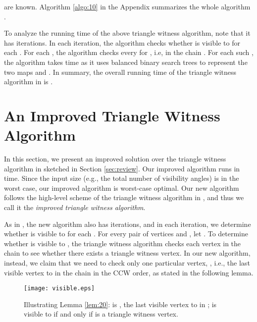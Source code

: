 \documentclass[11pt]{article}
\def\sectionspace{\vspace*{0in}}
\begin{document}
are known. Algorithm \ref{algo:10} in the Appendix summarizes the whole 
algorithm \cite{ref:DisserRe10}.

To analyze the running time of the above triangle witness algorithm,
note that it has  iterations. In each iteration, the
algorithm checks whether  is visible to  for
each . For each , the algorithm checks every 
for , i.e, in the chain . 
For each such , the algorithm takes  time as it 
uses balanced binary search trees to represent the two maps  and . 
In summary, the overall running time of the triangle witness algorithm in
\cite{ref:DisserRe10} is . 

\sectionspace
\section{An Improved Triangle Witness Algorithm}
\label{sec:improve}

In this section, we present an improved solution over the triangle
witness algorithm in \cite{ref:DisserRe10} 
sketched in Section \ref{sec:review}. Our improved
algorithm runs in  time. Since the input size (e.g., the total
number of visibility angles) is  in the worst case, our improved
algorithm is worst-case optimal. Our new algorithm follows the high-level 
scheme of the triangle witness algorithm in \cite{ref:DisserRe10}, and thus
we call it the {\em improved triangle witness algorithm}. 

As in \cite{ref:DisserRe10}, the new algorithm also has 
iterations, and in each iteration, we determine 
whether  is visible to  for each .
For every pair of vertices  and , let . To
determine whether 
is visible to , the triangle witness algorithm \cite{ref:DisserRe10}
checks each vertex  in the chain  to 
see whether there exists a triangle witness vertex. 
In our new algorithm, instead, we claim that we 
need to check only one particular vertex, , i.e., the
last visible vertex to  in the chain  in the
CCW order, as stated in the following lemma. 


\begin{figure}[t]
\begin{minipage}[t]{\linewidth}
\begin{center}
\texttt{[image: visible.eps]}
\caption{\footnotesize Illustrating Lemma \ref{lem:20}:  is
, the
last visible vertex to  in ;  is
visible to  if and only if  is a triangle witness vertex.
}\label{fig:visible}
\end{center}
\end{minipage}
\end{figure}
\end{document}
